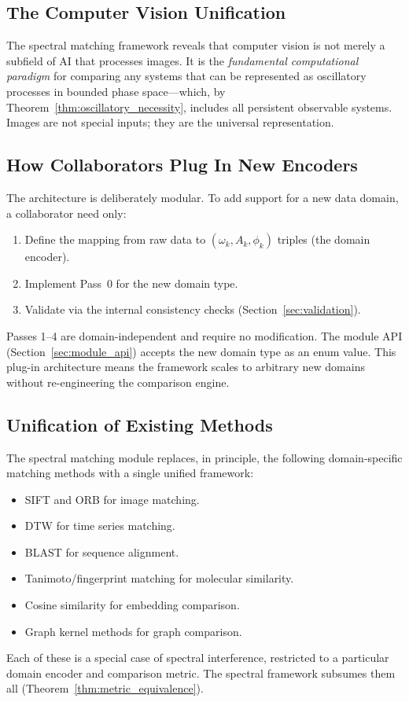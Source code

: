 \documentclass[11pt,twocolumn,a4paper]{article}
\begin{document}
\subsection{The Computer Vision Unification}

The spectral matching framework reveals that computer vision is not
merely a subfield of AI that processes images. It is the
\emph{fundamental computational paradigm} for comparing any systems that
can be represented as oscillatory processes in bounded phase space---which,
by Theorem~\ref{thm:oscillatory_necessity}, includes all persistent
observable systems. Images are not special inputs; they are the universal
representation.

\subsection{How Collaborators Plug In New Encoders}

The architecture is deliberately modular. To add support for a new data
domain, a collaborator need only:
\begin{enumerate}[nosep]
  \item Define the mapping from raw data to $(\omega_k, A_k, \phi_k)$
    triples (the domain encoder).
  \item Implement Pass~0 for the new domain type.
  \item Validate via the internal consistency checks
    (Section~\ref{sec:validation}).
\end{enumerate}
Passes 1--4 are domain-independent and require no modification. The
module API (Section~\ref{sec:module_api}) accepts the new domain type as
an enum value. This plug-in architecture means the framework scales to
arbitrary new domains without re-engineering the comparison engine.

\subsection{Unification of Existing Methods}

The spectral matching module replaces, in principle, the following
domain-specific matching methods with a single unified framework:
\begin{itemize}[nosep]
  \item SIFT \citep{lowe2004} and ORB \citep{rublee2011} for image
    matching.
  \item DTW \citep{sakoe1978} for time series matching.
  \item BLAST \citep{altschul1990} for sequence alignment.
  \item Tanimoto/fingerprint matching \citep{willett1998} for molecular
    similarity.
  \item Cosine similarity for embedding comparison.
  \item Graph kernel methods \citep{xu2019} for graph comparison.
\end{itemize}
Each of these is a special case of spectral interference, restricted to
a particular domain encoder and comparison metric. The spectral framework
subsumes them all (Theorem~\ref{thm:metric_equivalence}).
\end{document}
